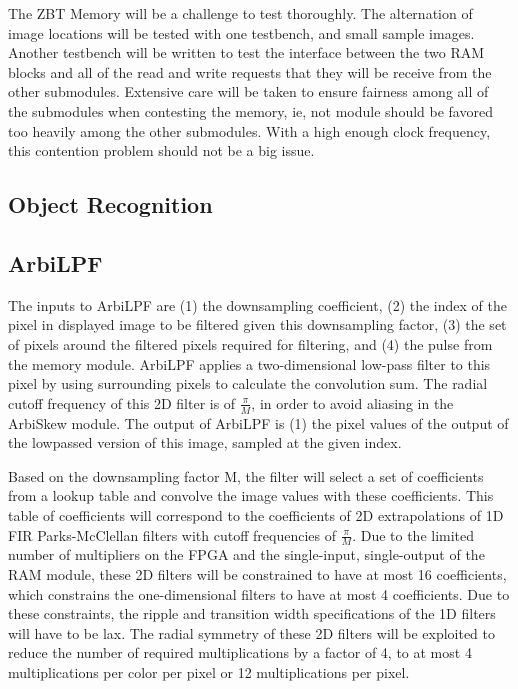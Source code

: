 \documentclass{article}
\begin{document}
The ZBT Memory will be a challenge to test thoroughly. The alternation of image locations will be tested with one testbench, and small sample images. Another testbench will be written to test the interface between the two RAM blocks and all of the read and write requests that they will be receive from the other submodules. Extensive care will be taken to ensure fairness among all of the submodules when contesting the memory, ie, not module should be favored too heavily among the other submodules. With a high enough clock frequency, this contention problem should not be a big issue.

\subsection{Object Recognition}

\subsection{ArbiLPF}
The inputs to ArbiLPF are (1) the downsampling coefficient, (2) the index of the pixel in displayed image to be filtered given this downsampling factor, (3) the set of pixels around the filtered pixels required for filtering, and (4) the pulse from the memory module. ArbiLPF applies a two-dimensional low-pass filter to this pixel by using surrounding pixels to calculate the convolution sum. The radial cutoff frequency of this 2D filter is of \( \frac{\pi}{M} \), in order to avoid aliasing in the ArbiSkew module. The output of ArbiLPF is (1) the pixel values of the output of the lowpassed version of this image, sampled at the given index.

Based on the downsampling factor M, the filter will select a set of coefficients from a lookup table and convolve the image values with these coefficients. This table of coefficients will correspond to the coefficients of 2D extrapolations of 1D FIR Parks-McClellan filters with cutoff frequencies of \( \frac{\pi}{M} \). Due to the limited number of multipliers on the FPGA and the single-input, single-output of the RAM module, these 2D filters will be constrained to have at most 16 coefficients, which constrains the one-dimensional filters to have at most 4 coefficients. Due to these constraints, the ripple and transition width specifications of the 1D filters will have to be lax. The radial symmetry of these 2D filters will be exploited to reduce the number of required multiplications by a factor of 4, to at most 4 multiplications per color per pixel or 12 multiplications per pixel.
\end{document}
